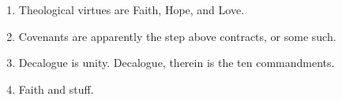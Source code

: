 \documentclass[11pt]{article}
\begin{document}
\begin{enumerate}
	\item Theological virtues are Faith, Hope, and Love.
	\item Covenants are apparently the step above contracts, or some such.
	\item Decalogue is unity.  Decalogue, therein is the ten commandments.
	\item Faith and stuff.
\end{enumerate}
\end{document}
